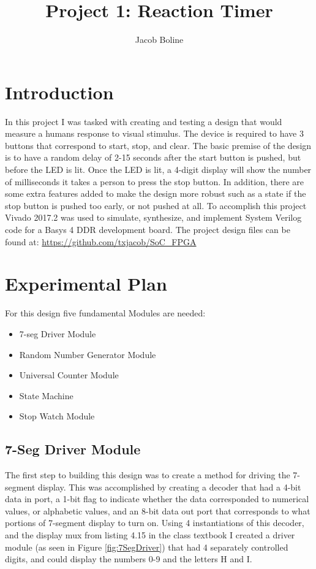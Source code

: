 \documentclass[11pt]{article}
\title{Project 1: Reaction Timer}
\author{Jacob Boline}
\begin{document}
\maketitle

\section{Introduction}
In this project I was tasked with creating and testing a design that would measure a humans response to visual stimulus. The device is required to have 3 buttons that correspond to start, stop, and clear. The basic premise of the design is to have a random delay of 2-15 seconds after the start button is pushed, but before the LED is lit. Once the LED is lit, a 4-digit display will show the number of milliseconds it takes a person to press the stop button. In addition, there are some extra features added to make the design more robust such as a state if the stop button is pushed too early, or not pushed at all. To accomplish this project Vivado 2017.2 was used to simulate, synthesize, and implement System Verilog code for a Basys 4 DDR development board. The project design files can be found at: \url{https://github.com/txjacob/SoC_FPGA}

\section{Experimental Plan}
For this design five fundamental Modules are needed:
\begin{itemize}
    \item 7-seg Driver Module
    \item Random Number Generator Module
    \item Universal Counter Module
    \item State Machine
    \item Stop Watch Module
\end{itemize}

\subsection{7-Seg Driver Module}
The first step to building this design was to create a method for driving the 7-segment display. This was accomplished by creating a decoder that had a 4-bit data in port, a 1-bit flag to indicate whether the data corresponded to numerical values, or alphabetic values, and an 8-bit data out port that corresponds to what portions of 7-segment display to turn on. Using 4 instantiations of this decoder, and the display mux from listing 4.15 in the class textbook I created a driver module (as seen in Figure \ref{fig:7SegDriver}) that had 4 separately controlled digits, and could display the numbers 0-9 and the letters H and I.
\end{document}
